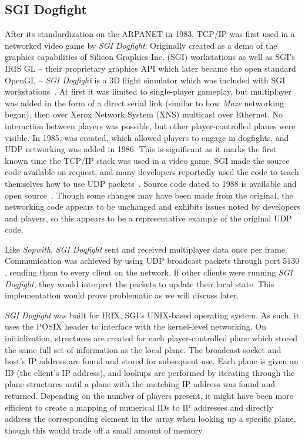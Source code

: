 \subsection{SGI Dogfight}\label{subsec:sgidogfight}

After its standardization on the ARPANET in 1983, TCP/IP was first used in a networked video game by \textit{SGI Dogfight}. Originally created as a demo of the graphics capabilities of Silicon Graphics Inc. (SGI) workstations as well as SGI's IRIS GL -- their proprietary graphics API which later became the open standard OpenGL -- \textit{SGI Dogfight} is a 3D flight simulator which was included with SGI workstations~\cite{zyda}. At first it was limited to single-player gameplay, but multiplayer was added in the form of a direct serial link (similar to how \textit{Maze} networking began), then over Xerox Network System (XNS) multicast over Ethernet. No interaction between players was possible, but other player-controlled planes were visible. In 1985,  was created, which allowed players to engage in dogfights, and UDP networking was added in 1986. This is significant as it marks the first known time the TCP/IP stack was used in a video game. SGI made the source code available on request, and many developers reportedly used the code to teach themselves how to use UDP packets~\cite{zyda}. Source code dated to 1988 is available and open source~\cite{dogsrc}. Though some changes may have been made from the original, the networking code appears to be unchanged and exhibits issues noted by developers and players, so this appears to be a representative example of the original UDP code.

Like \textit{Sopwith}, \textit{SGI Dogfight} sent and received multiplayer data once per frame. Communication was achieved by using UDP broadcast packets through port $5130$, sending them to every client on the network. If other clients were running \textit{SGI Dogfight}, they would interpret the packets to update their local state. This implementation would prove problematic as we will discuss later.

\textit{SGI Dogfight} was built for IRIX, SGI's UNIX-based operating system. As such, it uses the  POSIX header to interface with the kernel-level networking.
On initialization, structures are created for each player-controlled plane which stored the same full set of information as the local plane. The broadcast socket and host's IP address are found and stored for subsequent use. Each plane is given an ID (the client's IP address), and lookups are performed by iterating through the plane structures until a plane with the matching IP address was found and returned. Depending on the number of players present, it might have been more efficient to create a mapping of numerical IDs to IP addresses and directly address the corresponding element in the array when looking up a specific plane, though this would trade off a small amount of memory.

